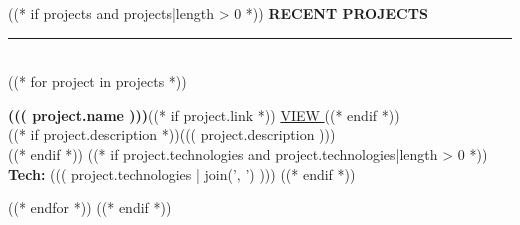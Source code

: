 \documentclass[11pt,a4paper]{article}
\begin{document}
\begin{minipage}[t]{0.60\textwidth}
\begin{minipage}[t]{0.85\textwidth}
((* if projects and projects|length > 0 *))
{\fontsize{11}{13}\selectfont\bfseries\color{banner}\MakeUppercase{Recent Projects}}\\[2pt]
{\color{divider}\rule{\linewidth}{1.5pt}}\\[8pt]
((* for project in projects *))
\begin{minipage}{\linewidth}
{\fontsize{10}{12}\selectfont\bfseries ((( project.name )))}((* if project.link *)) \hfill {\scriptsize\href{((* if 'http' not in project.link *))https://((* endif *))((( project.link )))}{\color{muted}VIEW \faExternalLinkAlt}}((* endif *))\\
((* if project.description *)){\fontsize{8.5}{11.5}\selectfont ((( project.description )))}\\((* endif *))
((* if project.technologies and project.technologies|length > 0 *))
{\fontsize{8}{10}\selectfont\color{muted}\textbf{Tech:} ((( project.technologies | join(', ') )))}
((* endif *))
\end{minipage}
\vspace{8pt}
((* endfor *))
((* endif *))

\end{minipage}
\end{minipage}%
\hfill
\end{document}
